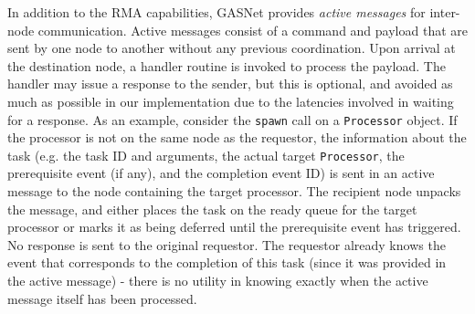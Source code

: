 In addition to the RMA capabilities, GASNet provides {\em active messages} for 
inter-node communication.  Active messages consist of a command and payload that
are sent by one node to another without any previous coordination.  Upon arrival
at the destination node, a handler routine is invoked to process the payload.
The handler may issue a response to the sender, but this is optional, and avoided
as much as possible in our implementation due to the latencies involved in waiting
for a response.  As an example, consider the {\tt spawn} call on a {\tt Processor}
object.  If the processor is not on the same node as the requestor, the information
about the task (e.g. the task ID and arguments, the actual target {\tt Processor},
the prerequisite event (if any), and the completion event ID) is sent in an
active message to the node containing the target processor.  The recipient node
unpacks the message, and either places the task on the ready queue for the target
processor or marks it as being deferred until the prerequisite event has triggered.
No response is sent to the original requestor.  The requestor already knows the event
that corresponds to the completion of this task (since it was provided in the active
message) - there is no utility in knowing exactly when the active message itself has
been processed.



